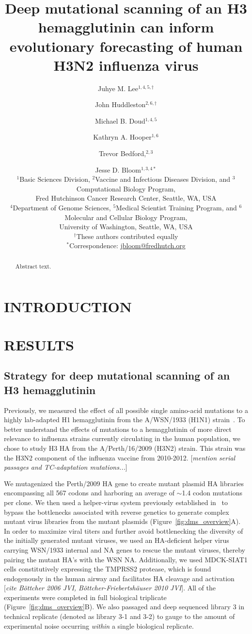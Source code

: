 \documentclass[11pt]{article}
\title{Deep mutational scanning of an H3 hemagglutinin can inform evolutionary forecasting of human H3N2 influenza virus}
\author{
Juhye M. Lee$^{1,4,5,\dagger}$ \and 
John Huddleston$^{2,6,\dagger}$ \and 
Michael B. Doud$^{1,4,5}$ \and 
Kathryn A. Hooper$^{1,6}$ \and
Trevor Bedford,$^{2,3}$ \and 
Jesse D. Bloom$^{1,3,4*}$
\\
\scriptsize{$^1$Basic Sciences Division, $^2$Vaccine and Infectious Diseases Division, and $^3$Computational Biology Program,} \\
\scriptsize{Fred Hutchinson Cancer Research Center, Seattle, WA, USA} \\
\scriptsize{$^4$Department of Genome Sciences, $^5$Medical Scientist Training Program, and $^6$Molecular and Cellular Biology Program,} \\
\scriptsize{University of Washington, Seattle, WA, USA} \\
\scriptsize{$^{\dagger}$These authors contributed equally} \\
\scriptsize{$^*$Correspondence: \href{jbloom@fredhutch.org}{jbloom@fredhutch.org}}
}
\date{}
\newcommand{\comment}[1]{{\color{red}[\textsl{#1}]}}
\begin{document}
\maketitle
\onehalfspacing

\begin{abstract}
Abstract text.
\end{abstract}

\section*{INTRODUCTION}

\section*{RESULTS}
\label{sec:results}

\subsection*{Strategy for deep mutational scanning of an H3 hemagglutinin}
Previously, we measured the effect of all possible single amino-acid mutations to a highly lab-adapted H1 hemagglutinin from the A/WSN/1933 (H1N1) strain~\citep{thyagarajan2014inherent,doud2016accurate}. 
To better understand the effects of mutations to a hemagglutinin of more direct relevance to influenza strains currently circulating in the human population, we chose to study H3 HA from the A/Perth/16/2009 (H3N2) strain. 
This strain was the H3N2 component of the influenza vaccine from 2010-2012.
\comment{mention serial passages and TC-adaptation mutations...}

We mutagenized the Perth/2009 HA gene to create mutant plasmid HA libraries encompassing all 567 codons and harboring an average of $\sim$1.4 codon mutations per clone.
We then used a helper-virus system previously established in~\cite{doud2016accurate} to bypass the bottlenecks associated with reverse genetics to generate complex mutant virus libraries from the mutant plasmids (Figure~\ref{fig:dms_overview}A).
In order to maximize viral titers and further avoid bottlenecking the diversity of the initially generated mutant viruses, we used an HA-deficient helper virus carrying WSN/1933 internal and NA genes to rescue the mutant viruses, thereby pairing the mutant HA's with the WSN NA.
Additionally, we used MDCK-SIAT1 cells constitutively expressing the TMPRSS2 protease, which is found endogenously in the human airway and facilitates HA cleavage and activation \comment{cite B\"{o}ttcher 2006 JVI, B\"{o}ttcher-Friebertsh\"{a}user 2010 JVI}.
All of the experiments were completed in full biological triplicate (Figure~\ref{fig:dms_overview}B). 
We also passaged and deep sequenced library 3 in technical replicate (denoted as library 3-1 and 3-2) to gauge to the amount of experimental noise occurring \textit{within} a single biological replicate.
\end{document}
